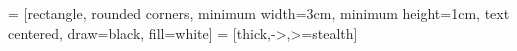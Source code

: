 \usetikzlibrary{shapes.geometric, arrows}
 = [rectangle,
rounded corners,
minimum width=3cm,
minimum height=1cm,
text centered,
draw=black,
fill=white]
 = [thick,->,>=stealth]

\usepackage{circuitikz} %


\usepackage{algorithm}
\makeatletter
\renewcommand{\ALG@name}{Алгоритм}
\makeatother
\usepackage{algpseudocode}
\renewcommand{\algorithmicrequire}{\textbf{Вход:}}
\renewcommand{\algorithmicensure}{\textbf{Выход:}}

\usepackage{listings}   %


\usepackage{datetime}   %
\usepackage{wasysym}    %
\usepackage{verbatim}   %
\usepackage{ifthen}     %

\allowdisplaybreaks
